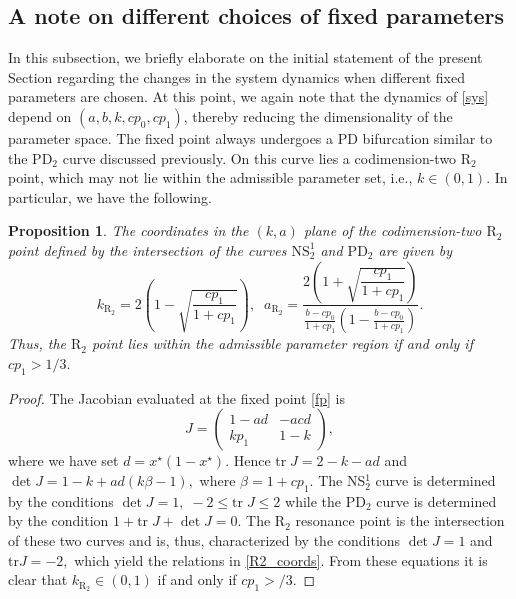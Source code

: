\documentclass{article}
\theoremstyle{plain}
\newtheorem{proposition}{Proposition}
\theoremstyle{definition}
\begin{document}
\subsection{A note on different choices of fixed parameters}\label{sec3.4}
In this subsection, we briefly elaborate on the initial statement of the present Section regarding the changes in the system dynamics when different fixed parameters are chosen. At this point, we again note that the dynamics of \eqref{sys} depend on $(a,b,k,cp_0,cp_1)$, thereby reducing the dimensionality of the parameter space. The fixed point always undergoes a PD bifurcation similar to the PD$_2$ curve discussed previously. On this curve lies a codimension-two R$_2$ point, which may not lie within the admissible parameter set, i.e., $k\in(0,1)$. In particular, we have the following.
\begin{proposition}\label{prop2}
The coordinates in the $(k,a)$ plane of the codimension-two $\mathrm{R}_2$ point defined by the intersection of the curves $\mathrm{NS}_2^1$ and $\mathrm{PD}_2$ are given by
\begin{equation}
k_{\mathrm{R}_2}=2\left(1-\sqrt{ \frac{cp_1}{1+cp_1}} \right), \; \; a_{\mathrm{R}_2}
=
\frac{
2\left(
1+\sqrt{\dfrac{cp_1}{1+cp_1}}
\right)
}{
\displaystyle
\frac{b-cp_0}{1+cp_1}
\left(
1-\frac{b-cp_0}{1+cp_1}
\right)
}.
\label{R2_coords}
\end{equation}
Thus, the $\mathrm{R}_2$ point lies within the admissible parameter region if and only if $cp_1> 1/3.$
\end{proposition}
\begin{proof}
The Jacobian evaluated at the fixed point \eqref{fp} is 
\[
J=
\begin{pmatrix}
1-ad & -acd\\
kp_1 & 1-k
\end{pmatrix},
\]
where we have set $d=x^\star(1-x^\star)$. Hence $\text{tr}\; J=2-k-ad$ and $\det J=1-k+ad(k\beta-1),$ where $\beta=1+cp_1.$ The NS$_2^1$ curve is determined by the conditions $\det J=1, \; -2\leq\mathrm{tr}\; J\leq 2$ while the PD$_2$ curve is determined by the condition $1+\text{tr} \;J+\det J=0.$ The R$_2$ resonance point is the intersection of these two curves and is, thus, characterized by the conditions $\det J=1$ and $\text{tr} J=-2,$ which yield the relations in \eqref{R2_coords}. From these equations it is clear that $k_{\text{R}_2}\in(0,1)$ if and only if $cp_1>/3.$

\end{proof}
\end{document}
